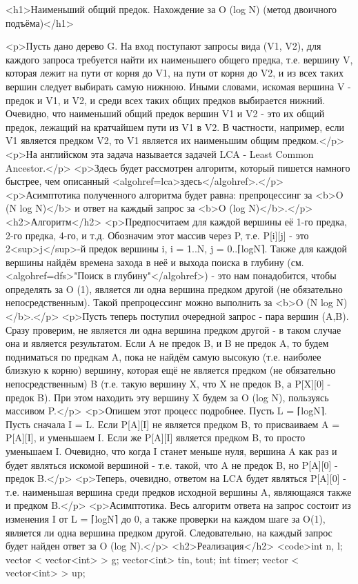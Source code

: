 <h1>Наименьший общий предок. Нахождение за O (log N) (метод двоичного подъёма)</h1>

<p>Пусть дано дерево G. На вход поступают запросы вида (V1, V2), для каждого запроса требуется найти их наименьшего общего предка, т.е. вершину V, которая лежит на пути от корня до V1, на пути от корня до V2, и из всех таких вершин следует выбирать самую нижнюю. Иными словами, искомая вершина V - предок и V1, и V2, и среди всех таких общих предков выбирается нижний. Очевидно, что наименьший общий предок вершин V1 и V2 - это их общий предок, лежащий на кратчайшем пути из V1 в V2. В частности, например, если V1 является предком V2, то V1 является их наименьшим общим предком.</p>
<p>На английском эта задача называется задачей LCA - Least Common Ancestor.</p>
<p>Здесь будет рассмотрен алгоритм, который пишется намного быстрее, чем описанный <algohref=lca>здесь</algohref>.</p>
<p>Асимптотика полученного алгоритма будет равна: препроцессинг за <b>O (N log N)</b> и ответ на каждый запрос за <b>O (log N)</b>.</p>
<h2>Алгоритм</h2>
<p>Предпосчитаем для каждой вершины её 1-го предка, 2-го предка, 4-го, и т.д. Обозначим этот массив через P, т.е. P[i][j] - это 2<sup>j</sup>-й предок вершины i, i = 1..N, j = 0..⌈logN⌉. Также для каждой вершины найдём времена захода в неё и выхода поиска в глубину (см. <algohref=dfs>"Поиск в глубину"</algohref>) - это нам понадобится, чтобы определять за O (1), является ли одна вершина предком другой (не обязательно непосредственным). Такой препроцессинг можно выполнить за <b>O (N log N)</b>.</p>
<p>Пусть теперь поступил очередной запрос - пара вершин (A,B). Сразу проверим, не является ли одна вершина предком другой - в таком случае она и является результатом. Если A не предок B, и B не предок A, то будем подниматься по предкам A, пока не найдём самую высокую (т.е. наиболее близкую к корню) вершину, которая ещё не является предком (не обязательно непосредственным) B (т.е. такую вершину X, что X не предок B, а P[X][0] - предок B). При этом находить эту вершину X будем за O (log N), пользуясь массивом P.</p>
<p>Опишем этот процесс подробнее. Пусть L = ⌈logN⌉. Пусть сначала I = L. Если P[A][I] не является предком B, то присваиваем A = P[A][I], и уменьшаем I. Если же P[A][I] является предком B, то просто уменьшаем I. Очевидно, что когда I станет меньше нуля, вершина A как раз и будет являться искомой вершиной - т.е. такой, что A не предок B, но P[A][0] - предок B.</p>
<p>Теперь, очевидно, ответом на LCA будет являться P[A][0] - т.е. наименьшая вершина среди предков исходной вершины A, являющаяся также и предком B.</p>
<p>Асимптотика. Весь алгоритм ответа на запрос состоит из изменения I от L = ⌈logN⌉ до 0, а также проверки на каждом шаге за O(1), является ли одна вершина предком другой. Следовательно, на каждый запрос будет найден ответ за O (log N).</p>
<h2>Реализация</h2>
<code>int n, l;
vector < vector<int> > g;
vector<int> tin, tout;
int timer;
vector < vector<int> > up;

